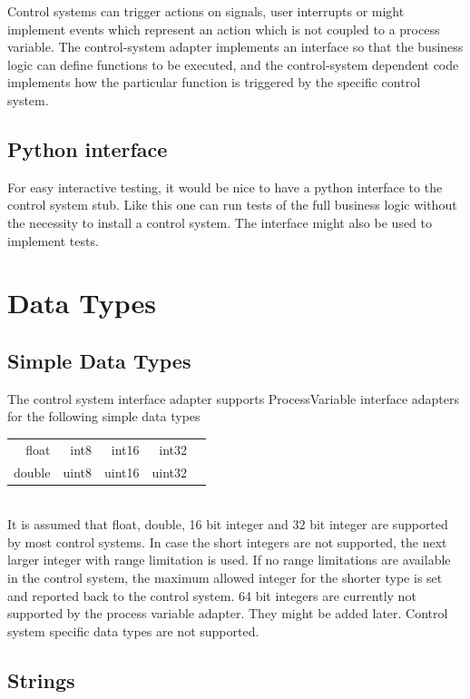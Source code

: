 \documentclass[11pt,a4paper]{scrartcl}
\begin{document}
Control systems can trigger actions on signals, user interrupts or might
implement events which represent an action which is not coupled to a process
variable. The control-system adapter implements an interface so that the
business logic can define functions to be executed, and the control-system
dependent code implements how the particular function is triggered by the
specific control system. 

\subsection{Python interface}

For easy interactive testing, it would be nice to have a python interface to
the control system stub. Like this one can run tests of the full business
logic without the necessity to install a control system. The interface might
also be used to implement tests. 

\section{Data Types}

\subsection{Simple Data Types}

The control system interface adapter supports ProcessVariable interface
adapters for the following simple data types\\[2ex] 
\begin{tabular}{rrrrr}
float & int8 & int16 & int32\\
double & uint8 & uint16 & uint32\\
\end{tabular}\\[1ex]

It is assumed that float, double, 16 bit integer and 32 bit integer are
supported by most control systems.
In case the short integers are not supported, the next larger
integer with range limitation is used. If no range limitations are available
in the control system, the maximum allowed integer for the shorter type is set
and reported back to the control system. 64 bit integers are currently not supported 
by the process variable adapter. They might be added later.
Control system specific data types are not supported.

\subsection{Strings}
\end{document}
